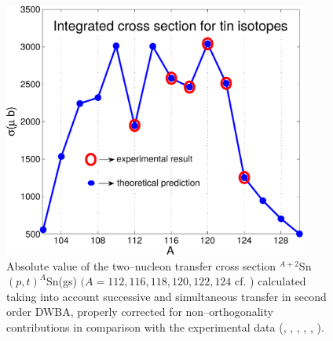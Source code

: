 %



  \begin{figure}
  \centerline{\includegraphics*[width=10cm,angle=0]{nutshell/figs/cross_strength.pdf}}
  \caption{Absolute value of the  two--nucleon transfer cross section $^{A+2}$Sn$(p,t)^A$Sn(gs) $(A=112,116,118,120,122,124$ cf. \cite{Potel:13} \cite{Potel:13b}) calculated taking into account successive and simultaneous transfer in second order DWBA, properly corrected for non--orthogonality contributions in comparison with the experimental data (\cite{Guazzoni:99}, \cite{Guazzoni:04}, \cite{Guazzoni:06}, \cite{Guazzoni:08}, \cite{Guazzoni:11}, \cite{Guazzoni:12}).}\label{fig1.5}
  \end{figure}





